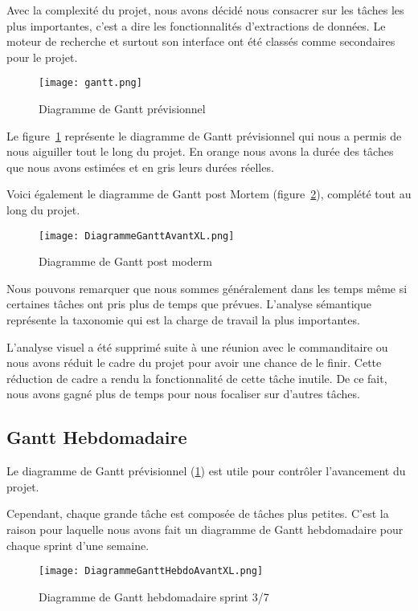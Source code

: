 Avec la complexité du projet, nous avons décidé nous consacrer sur les tâches les plus importantes, c'est a dire les fonctionnalités d'extractions de données.
Le moteur de recherche et surtout son interface ont été classés comme secondaires pour le projet.

\begin{figure}[h!]
  \texttt{[image: gantt.png]}
	\caption{Diagramme de Gantt prévisionnel}
	\label{fig:ganttprev}
\end{figure}

Le figure~\ref{fig:ganttprev} représente le diagramme de Gantt prévisionnel qui nous a permis de nous aiguiller tout le long du projet.
En orange nous avons la durée des tâches que nous avons estimées et en gris leurs durées réelles.

Voici également le diagramme de Gantt post Mortem (figure~\ref{fig:postmortem}), complété tout au long du projet.
\begin{figure}[h!]
  \texttt{[image: DiagrammeGanttAvantXL.png]}
	\caption{Diagramme de Gantt post moderm}
	\label{fig:postmortem}
\end{figure}


Nous pouvons remarquer que nous sommes généralement dans les temps même si certaines tâches ont pris plus de temps que prévues.
L'analyse sémantique représente la taxonomie qui est la charge de travail la plus importantes. 

L'analyse visuel a été supprimé suite à une réunion avec le commanditaire ou nous avons réduit le cadre du projet pour avoir une chance de le finir.
Cette réduction de cadre a rendu la fonctionnalité de cette tâche inutile.
De ce fait, nous avons gagné plus de temps pour nous focaliser sur d'autres tâches. 


\subsection{Gantt Hebdomadaire}
Le diagramme de Gantt prévisionnel (\ref{fig:ganttprev}) est utile pour contrôler l'avancement du projet.

Cependant, chaque grande tâche est composée de tâches plus petites. 
C'est la raison pour laquelle nous avons fait un diagramme de Gantt hebdomadaire pour chaque sprint d'une semaine.

\begin{figure}[h!]
  \centering
  \texttt{[image: DiagrammeGanttHebdoAvantXL.png]}
  \caption[]{Diagramme de Gantt hebdomadaire sprint 3/7}
  \label{fig:gantthebdo}
\end{figure}

